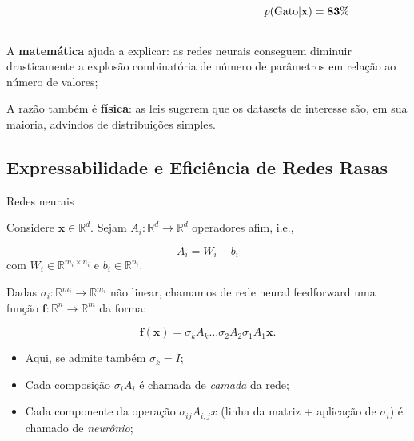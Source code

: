 \documentclass{beamer}
\begin{document}
\begin{frame}
\begin{columns}
\begin{column}{0.3\textwidth}
\begin{figure}
            \end{figure}
        \end{column}
        \begin{column}{0.3\textwidth}
            \[
                p(\text{Gato} |\bf{x}) = 83\%
            \]
        \end{column}
    \end{columns}
    
    \vspace{1em}

    \pause

    A \textbf{matemática} ajuda a explicar: as redes neurais conseguem diminuir drasticamente a explosão combinatória de número de parâmetros em relação ao número de valores;
    \vspace{1em}
    
    \pause

    A razão também é \textbf{física}: as leis sugerem que os datasets de interesse são, em sua maioria, advindos de distribuições simples.

\end{frame}


\subsection{Expressabilidade e Eficiência de Redes Rasas}
\begin{frame}
    \tableofcontents[currentsection]
\end{frame}

\begin{frame}{Redes neurais}

    Considere $\mathbf x \in \mathbb R^d$. Sejam $A_i:\mathbb R^d \to \mathbb R^d$ operadores afim, i.e.,

    \[
        A_i = W_i - b_i
    \]
    com $W_i \in \mathbb R^{m_i \times n_i}$ e $b_i \in \mathbb R^{n_i}$.

    \vspace{1em}

    \pause 

    Dadas $\sigma_i:\mathbb R^{m_i} \to \mathbb R^{m_i}$ não linear, chamamos de rede neural feedforward uma função $\mathbf f: \mathbb R^n \to \mathbb R^m$ da forma:

    \begin{equation}
        \mathbf f (\mathbf x) = \sigma_k A_k \dots \sigma_2 A_2 \sigma_1 A_1 \mathbf x.
    \end{equation}

    \pause 

    \begin{itemize}
        \item Aqui, se admite também $\sigma_k = I$; 
        \item Cada composição $\sigma_i A_i$ é chamada de \textit{camada} da rede;
        \item Cada componente da operação $\sigma_{ij} A_{i,j} x$ (linha da matriz + aplicação de $\sigma_i$) é chamado de \textit{neurônio};
    \end{itemize}

\end{frame}
\end{document}
